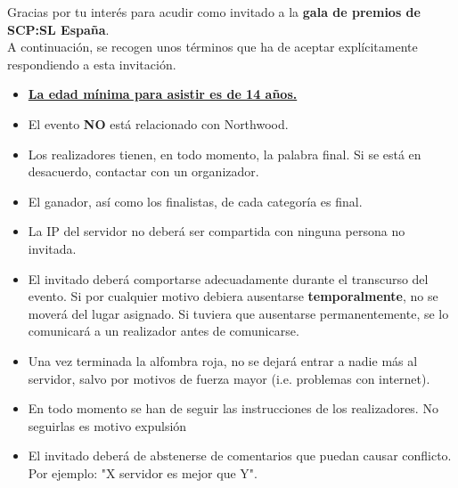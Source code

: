 \documentclass[dvipsnames,12pt]{article}
\begin{document}
	
	
	Gracias por tu interés para acudir como invitado a la \textbf{gala de premios de SCP:SL España}. \\
	A continuación, se recogen unos términos que ha de aceptar explícitamente respondiendo a esta invitación.
	\begin{itemize}
		\item \textbf{\underline{La edad mínima para asistir es de 14 años.}}
		\item El evento \textbf{NO} está relacionado con Northwood.
		\item Los realizadores tienen, en todo momento, la palabra final. Si se está en desacuerdo, contactar con un organizador.
		\item El ganador, así como los finalistas, de cada categoría es final. 
		\item La IP del servidor no deberá ser compartida con ninguna persona no invitada.
		\item El invitado deberá comportarse adecuadamente durante el transcurso del evento. Si por cualquier motivo debiera ausentarse \textbf{temporalmente}, no se moverá del lugar asignado. Si tuviera que ausentarse permanentemente, se lo comunicará a un realizador antes de comunicarse.
		\item Una vez terminada la alfombra roja, no se dejará entrar a nadie más al servidor, salvo por motivos de fuerza mayor (i.e. problemas con internet).
		\item En todo momento se han de seguir las instrucciones de los realizadores. No seguirlas es motivo expulsión
		\item El invitado deberá de abstenerse de comentarios que puedan causar conflicto. Por ejemplo: "X servidor es mejor que Y".
	\end{itemize}
	
\end{document}
